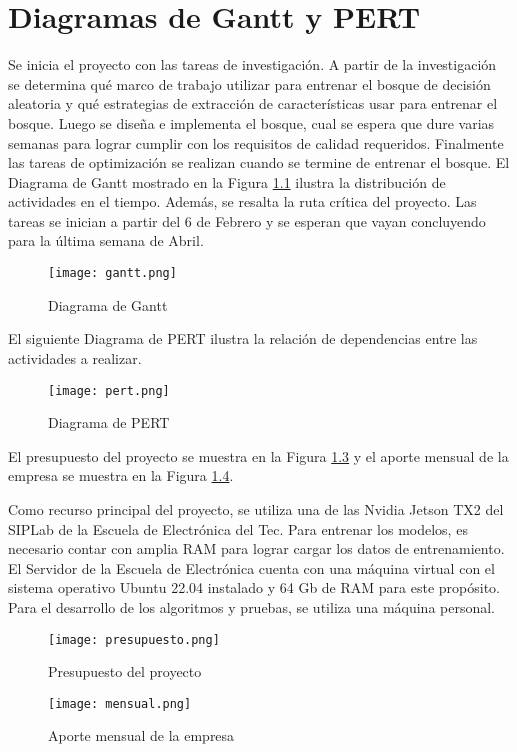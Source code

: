 
\chapter{Diagramas de Gantt y PERT}
\label{chp:diagramas}

Se inicia el proyecto con las tareas de investigación. A partir de la investigación se determina qué marco de trabajo utilizar para entrenar el bosque de decisión aleatoria y qué estrategias de extracción de características usar para entrenar el bosque. Luego se diseña e implementa el bosque, cual se espera que dure varias semanas para lograr cumplir con los requisitos de calidad requeridos. Finalmente las tareas de optimización se realizan cuando se termine de entrenar el bosque. El Diagrama de Gantt mostrado en la Figura \ref{fig:gantt} ilustra la distribución de actividades en el tiempo. Además, se resalta la ruta crítica del proyecto. Las tareas se inician a partir del 6 de Febrero y se esperan que vayan concluyendo para la última semana de Abril.

\begin{figure} [!h]
    \centering
    \texttt{[image: gantt.png]}
    \caption{Diagrama de Gantt}
    \label{fig:gantt}
\end{figure}

El siguiente Diagrama de PERT ilustra la relación de dependencias entre las
actividades a realizar.

\begin{figure} [!htb]
    \centering
    \texttt{[image: pert.png]}
    \caption{Diagrama de PERT}
    \label{fig:pert}
\end{figure}

El presupuesto del proyecto se muestra en la Figura \ref{fig:presupuesto} y el aporte mensual de la empresa se muestra en la Figura \ref{fig:mensual}.

Como recurso principal del proyecto, se utiliza una de las Nvidia Jetson TX2 del SIPLab de la Escuela de Electrónica del Tec. Para entrenar los modelos, es necesario contar con amplia RAM para lograr cargar los datos de entrenamiento. El Servidor de la Escuela de Electrónica cuenta con una máquina virtual con el sistema operativo Ubuntu 22.04 instalado y 64 Gb de RAM para este propósito. Para el desarrollo de los algoritmos y pruebas, se utiliza una máquina personal.

\begin{figure} [!htb]
    \centering
    \texttt{[image: presupuesto.png]}
    \caption{Presupuesto del proyecto}
    \label{fig:presupuesto}
\end{figure}

\begin{figure} [!htb]
    \centering
    \texttt{[image: mensual.png]}
    \caption{Aporte mensual de la empresa}
    \label{fig:mensual}
\end{figure}
